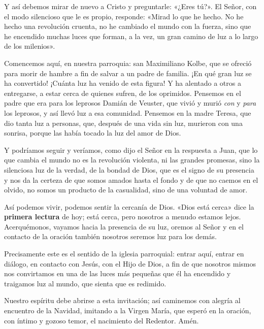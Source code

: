 \documentclass[]{article}
\begin{document}
Y así debemos mirar de nuevo a Cristo y preguntarle: «¿Eres tú?». El
Señor, con el modo silencioso que le es propio, responde: «Mirad lo que
he hecho. No he hecho una revolución cruenta, no he cambiado el mundo
con la fuerza, sino que he encendido muchas luces que forman, a la vez,
un gran camino de luz a lo largo de los milenios».

Comencemos aquí, en nuestra parroquia: san Maximiliano Kolbe, que se
ofreció para morir de hambre a fin de salvar a un padre de familia. ¡En
qué gran luz se ha convertido! ¡Cuánta luz ha venido de esta figura! Y
ha alentado a otros a entregarse, a estar cerca de quienes sufren, de
los oprimidos. Pensemos en el padre que era para los leprosos Damián de
Veuster, que vivió y murió \emph{con} y \emph{para} los leprosos, y así
llevó luz a esa comunidad. Pensemos en la madre Teresa, que dio tanta
luz a personas, que, después de una vida sin luz, murieron con una
sonrisa, porque las había tocado la luz del amor de Dios.

Y podríamos seguir y veríamos, como dijo el Señor en la respuesta a
Juan, que lo que cambia el mundo no es la revolución violenta, ni las
grandes promesas, sino la silenciosa luz de la verdad, de la bondad de
Dios, que es el signo de su presencia y nos da la certeza de que somos
amados hasta el fondo y de que no caemos en el olvido, no somos un
producto de la casualidad, sino de una voluntad de amor.

Así podemos vivir, podemos sentir la cercanía de Dios. «Dios está cerca»
dice la \textbf{primera lectura} de hoy; está cerca, pero nosotros a
menudo estamos lejos. Acerquémonos, vayamos hacia la presencia de su
luz, oremos al Señor y en el contacto de la oración también nosotros
seremos luz para los demás.

Precisamente este es el sentido de la iglesia parroquial: entrar aquí,
entrar en diálogo, en contacto con Jesús, con el Hijo de Dios, a fin de
que nosotros mismos nos convirtamos en una de las luces más pequeñas que
él ha encendido y traigamos luz al mundo, que sienta que es redimido.

Nuestro espíritu debe abrirse a esta invitación; así caminemos con
alegría al encuentro de la Navidad, imitando a la Virgen María, que
esperó en la oración, con íntimo y gozoso temor, el nacimiento del
Redentor. Amén.

\protect\hypertarget{_Toc448662749}{}{\protect\hypertarget{_Toc448690268}{}{\protect\hypertarget{_Toc448708291}{}{\protect\hypertarget{_Toc448709377}{}{\protect\hypertarget{_Toc449554379}{}{}}}}}
\end{document}
